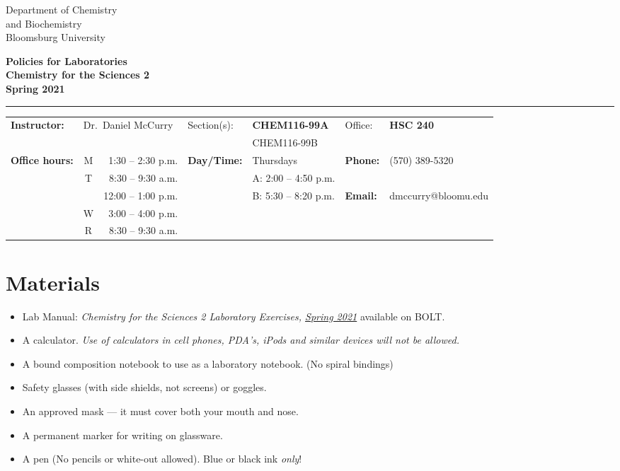 \documentclass[10pt,letterpaper]{article}
\begin{document}
\noindent
\begin{minipage}{0.45\linewidth}
	\copperplate\centering
	Department of Chemistry \\
	and Biochemistry \\
	Bloomsburg University
\end{minipage}
\hfill
\begin{minipage}{0.45\linewidth}
	\bfseries
	\fontsize{14}{16}\selectfont Policies for Laboratories \\
	\fontsize{12}{14}\selectfont Chemistry for the Sciences 2 \\
	\normalfont \fontsize{11}{11}\selectfont Spring 2021
\end{minipage}

\bigskip

\hrule

\bigskip

\noindent
\begin{tabularx}{\linewidth}{@{}>{\bfseries}lcr*{2}{>{\bfseries}lX}}
	Instructor: & \multicolumn{2}{l}{Dr.\ Daniel McCurry} & Section(s): & CHEM116-99A & Office: & HSC 240 \\
		    &      &               &             & CHEM116-99B &         & \\[0.5em]
		    Office hours: & M & 1:30 -- 2:30 p.m.  & Day/Time: & Thursdays & Phone: & (570) 389-5320 \\
				  & T & 8:30 -- 9:30 a.m.  &           & A: 2:00
		    -- 4:50 p.m. &  & \\
		      & & 12:00 -- 1:00 p.m. &           & B: 5:30 -- 8:20 p.m.  & Email: & dmccurry@bloomu.edu       \\
		      & W & 3:00 -- 4:00 p.m. \\
		      & R & 8:30 -- 9:30 a.m. \\
\end{tabularx}

\section*{Materials}
\begin{itemize}[noitemsep]
	\item Lab Manual: \textit{Chemistry for the Sciences 2 Laboratory
		Exercises, \underline{Spring 2021}} available on BOLT.
	\item  A calculator. \textit{Use of calculators in cell phones, PDA’s,
		iPods and similar devices will not be allowed.}
	\item A bound composition notebook to use as a laboratory notebook. (No spiral bindings)
	\item Safety glasses (with side shields, not screens) or goggles.
	\item An approved mask --- it must cover both your mouth and nose.
	\item A permanent marker for writing on glassware.
	\item A pen (No pencils or white-out allowed). Blue or black ink
		\emph{only}!
\end{itemize}
\end{document}
